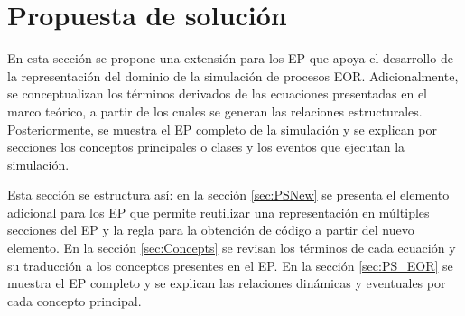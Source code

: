 \chapter{Propuesta de solución}
En esta sección se propone una extensión para los EP que apoya el desarrollo de la representación del dominio de la simulación de procesos EOR. Adicionalmente, se conceptualizan los términos derivados de las ecuaciones presentadas en el marco teórico, a partir de los cuales se generan las relaciones estructurales. Posteriormente, se muestra el EP completo de la simulación y se explican por secciones los conceptos principales o clases y los eventos que ejecutan la simulación.

Esta sección se estructura así: en la sección \ref{sec:PSNew} se presenta el elemento adicional para los EP que permite reutilizar una representación en múltiples secciones del EP y la regla para la obtención de código a partir del nuevo elemento. En la sección \ref{sec:Concepts} se revisan los términos de cada ecuación y su traducción a los conceptos presentes en el EP. En la sección \ref{sec:PS_EOR} se muestra el EP completo y se explican las relaciones dinámicas y eventuales por cada concepto principal.




